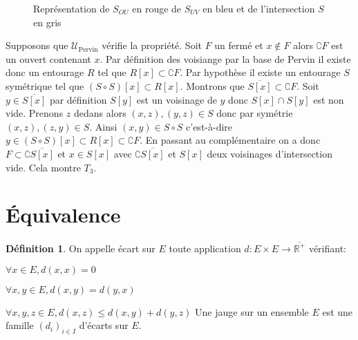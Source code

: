 \documentclass[a4paper, 11pt, french]{book}
\newenvironment{itemise}{\itemize}{\enditemize}
\theoremstyle{plain} %
\theoremstyle{definition} %
\newtheorem{definition}{Définition}
\theoremstyle{remark} %
\newcommand{\1}{\mathds{1}}
\newcommand{\R}{\mathbb{R}}
\newcommand{\scr}[1]{\mathscr{#1}}
\renewcommand{\rm}[1]{\mathrm{#1}}
\begin{document}
{\begin{figure}
		\caption{Représentation de $S_{OU}$ en rouge de $S_{UV}$ en bleu et de l'intersection $S$ en gris}
		\label{fig:pervin-T3}
	\end{figure}
}{
	Supposons que $\scr{U}_\rm{Pervin}$ vérifie la propriété.
	Soit $F$ un fermé et $x\notin F$ alors $\complement F$ est un ouvert contenant $x$.
	Par définition des voisiange par la base de Pervin il existe donc un entourage $R$ tel que $R[x]\subset\complement F$.
	Par hypothèse il existe un entourage $S$ symétrique tel que $(S\circ S)[x]\subset R[x]$.
	Montrons que $\overline{S[x]}\subset\complement F$.
	Soit $y\in\overline{S[x]}$ par définition $S[y]$ est un voisinage de $y$ donc $S[x]\cap S[y]$ est non vide.
	Prenons $z$ dedans alors $(x, z), (y, z)\in S$ donc par symétrie $(x, z), (z, y)\in S$.
	Ainsi $(x, y)\in S\circ S$ c'est-à-dire $y\in (S\circ S)[x]\subset R[x]\subset\complement F$.
	En passant au complémentaire on a donc $F\subset\complement\overline{S[x]}$ et $x\in S[x]$ avec $\complement\overline{S[x]}$ et $S[x]$ deux voisinages d'intersection vide.
	Cela montre $T_3$.
}

\section{Équivalence}

\begin{definition}
	On appelle écart sur $E$ toute application $d:E\times E\rightarrow\overline{\R^+}$ vérifiant:
	\begin{itemise}
		\item $\forall x\in E, d(x, x)=0$
		\item $\forall x, y\in E, d(x, y)=d(y, x)$
		\item $\forall x, y, z\in E, d(x, z)\leqslant d(x, y)+d(y, z)$
	\end{itemise}
	Une jauge sur un ensemble $E$ est une famille $(d_i)_{i\in I}$ d'écarts sur $E$.
\end{definition}
\end{document}
